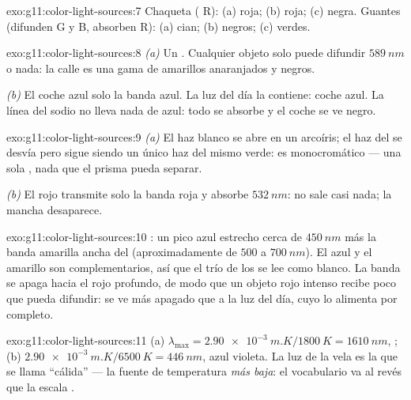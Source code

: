 \begin{solution}{exo:g11:color-light-sources:7}
Chaqueta ( R): (a) roja; (b) roja; (c) negra. Guantes (difunden G
y B, absorben R): (a) cian; (b) negros; (c) verdes.
\end{solution}

\begin{solution}{exo:g11:color-light-sources:8}
\emph{(a)} Un . Cualquier objeto solo puede
difundir $\qty{589}{nm}$ o nada: la calle es una gama de amarillos
anaranjados y negros.

\emph{(b)} El coche azul solo  la banda azul. La luz del día la
contiene: coche azul. La línea del sodio no lleva nada de azul: todo se
absorbe y el coche se ve negro.
\end{solution}

\begin{solution}{exo:g11:color-light-sources:9}
\emph{(a)} El haz blanco se abre en un arcoíris; el haz del  se
desvía pero sigue siendo un único haz del mismo verde: es monocromático
--- una sola , nada que el prisma pueda separar.

\emph{(b)} El  rojo transmite solo la banda roja y absorbe
$\qty{532}{nm}$: no sale casi nada; la mancha desaparece.
\end{solution}

\begin{solution}{exo:g11:color-light-sources:10}
: un pico azul estrecho cerca de $\qty{450}{nm}$ más la banda
amarilla ancha del  (aproximadamente de $500$ a
$\qty{700}{nm}$). El azul y el amarillo son complementarios, así que el
trío de los  se lee como blanco. La banda se apaga hacia el rojo
profundo, de modo que un objeto rojo intenso recibe poco que pueda
difundir: se ve más apagado que a la luz del día, cuyo 
lo alimenta por completo.
\end{solution}

\begin{solution}{exo:g11:color-light-sources:11}
(a) $\lambda_{\max} = \qty{2.90e-3}{m.K}/\qty{1800}{K}
= \qty{1610}{nm}$, ;
(b) $\qty{2.90e-3}{m.K}/\qty{6500}{K} = \qty{446}{nm}$, azul violeta. La
luz de la vela es la que se llama ``cálida'' --- la fuente de
temperatura \emph{más baja}: el vocabulario va al revés que la escala
.
\end{solution}

